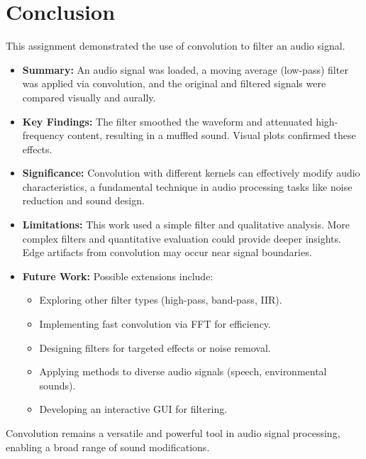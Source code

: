 \documentclass[12pt, a4paper]{article}
\begin{document}
\section{Conclusion}
\label{sec:conclusion}

This assignment demonstrated the use of convolution to filter an audio signal.

\begin{itemize}
    \item \textbf{Summary:} An audio signal was loaded, a moving average (low-pass) filter was applied via convolution, and the original and filtered signals were compared visually and aurally.
    \item \textbf{Key Findings:} The filter smoothed the waveform and attenuated high-frequency content, resulting in a muffled sound. Visual plots confirmed these effects.
    \item \textbf{Significance:} Convolution with different kernels can effectively modify audio characteristics, a fundamental technique in audio processing tasks like noise reduction and sound design.
    \item \textbf{Limitations:} This work used a simple filter and qualitative analysis. More complex filters and quantitative evaluation could provide deeper insights. Edge artifacts from convolution may occur near signal boundaries.
    \item \textbf{Future Work:} Possible extensions include:
        \begin{itemize}
            \item Exploring other filter types (high-pass, band-pass, IIR).
            \item Implementing fast convolution via FFT for efficiency.
            \item Designing filters for targeted effects or noise removal.
            \item Applying methods to diverse audio signals (speech, environmental sounds).
            \item Developing an interactive GUI for filtering.
        \end{itemize}
\end{itemize}

Convolution remains a versatile and powerful tool in audio signal processing, enabling a broad range of sound modifications.



\end{document}
